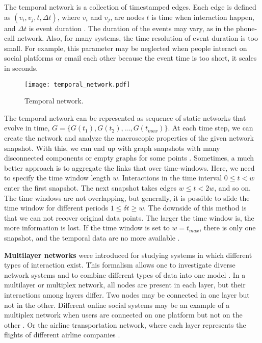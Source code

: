 The temporal network is a collection of timestamped edges. Each edge is defined as $(v_i, v_j, t, \Delta t)$, where $v_i$ and $v_j$, are nodes $t$ is time when interaction happen, and $\Delta t$ is event duration \cite{guide_temporal}. The duration of the events may vary, as in the phone-call network. Also, for many systems, the time resolution of event duration is too small. For example, this parameter may be neglected when people interact on social platforms or email each other because the event time is too short, it scales in seconds.

\begin{figure}[h]
	\centering
	\texttt{[image: temporal\_network.pdf]} 
	\caption[Temporal network.]{Temporal network. }
	\label{fig:gt3}
\end{figure}

The temporal network can be represented as sequence of static networks that evolve in time, $G = \{ G(t_1), G(t_2), ..., G(t_{max})\}$. At each time step, we can create the network and analyze the macroscopic properties of the given network snapshot. With this, we can end up with graph snapshots with many disconnected components or empty graphs for some points \cite{holme2015modern}. Sometimes, a much better approach is to aggregate the links that over time-windows. Here, we need to specify the time window length $w$. Interactions in the time interval $0\leq t<w$ enter the first snapshot. The next snapshot takes edges $w \leq t <2w$, and so on. The time windows are not overlapping, but generally, it is possible to slide the time window for different periods $ 1 \leq \delta t \geq w$. The downside of this method is that we can not recover original data points. The larger the time window is, the more information is lost. If the time window is set to $w=t_{max}$, there is only one snapshot, and the temporal data are no more available \cite{krings2012effects, arnold2021moving}. 

\textbf{Multilayer networks} were introduced for studying systems in which different types of interaction exist. This formalism allows one to investigate diverse network systems and to combine different types of data into one model \cite{porter2018multilayer}. In a multilayer or multiplex network, all nodes are present in each layer, but their interactions among layers differ. Two nodes may be connected in one layer but not in the other. Different online social systems may be an example of a multiplex network when users are connected on one platform but not on the other \cite{aleta2019multilayer}. Or the airline transportation network, where each layer represents the flights of different airline companies \cite{kivelamultilayer}.  


